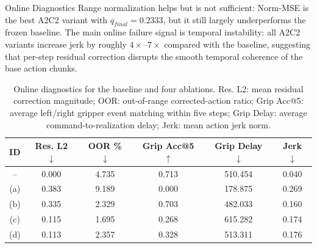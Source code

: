 \documentclass[final]{beamer}
\newlength{\colwidth}
\begin{document}
\begin{frame}[t]
\begin{columns}[t]
\begin{column}{\colwidth}
				


			\begin{exampleblock}{Online Diagnostics}
				Range normalization helps but is not sufficient: Norm-MSE is the best
				A2C2 variant with $q_{final}=0.2333$, but it still largely underperforms
				the frozen baseline.
				The main online failure signal is temporal instability: all A2C2 variants
				increase jerk by roughly $4\times$--$7\times$ compared with the baseline,
				suggesting that per-step residual correction disrupts the smooth temporal
				coherence of the base action chunks.

				\vspace{-0.3em}
				\begin{table}[t]
					\centering
					\small
					\begin{tabular}{c c c c c c}
						\toprule
						\textbf{ID} &
						\textbf{Res. L2} $\downarrow$ &
						\textbf{OOR \%} $\downarrow$ &
						\textbf{Grip Acc@5} $\uparrow$ &
						\textbf{Grip Delay} $\downarrow$ &
						\textbf{Jerk} $\downarrow$ \\
						\midrule
						-- & 0.000 & 4.735 & 0.713 & 510.454 & 0.040 \\
						(a) & 0.383 & 9.189 & 0.000 & 178.875 & 0.269 \\
						(b) & 0.335 & 2.329 & 0.703 & 482.033 & 0.160 \\
						(c) & 0.115 & 1.695 & 0.268 & 615.282 & 0.174 \\
						(d) & 0.113 & 2.357 & 0.328 & 513.311 & 0.176 \\
						\bottomrule
					\end{tabular}
					\caption{
						Online diagnostics for the baseline and four ablations.
						Res. L2: mean residual correction magnitude;
						OOR: out-of-range corrected-action ratio;
						Grip Acc@5: average left/right gripper event matching within five steps;
						Grip Delay: average command-to-realization delay;
						Jerk: mean action jerk norm.
					}
					\label{tab:a2c2_online_diagnostics}
				\end{table}
			\end{exampleblock}



\end{column}
\end{columns}
\end{frame}
\end{document}
